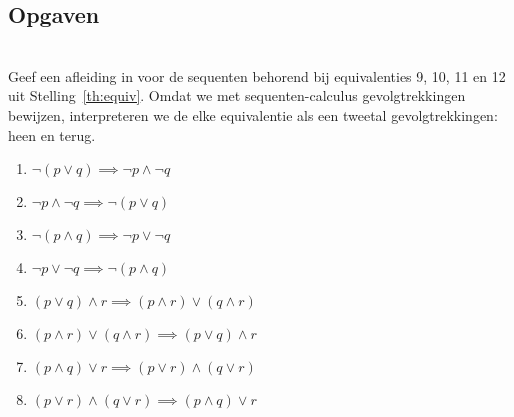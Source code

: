 \subsection{Opgaven}
\begin{exercise}\mbox{}\\
  Geef een afleiding in \lk{} voor de sequenten behorend bij equivalenties 9, 10, 11 en 12 uit Stelling~\ref{th:equiv}. Omdat we met sequenten-calculus gevolgtrekkingen bewijzen, interpreteren we de elke equivalentie als een tweetal gevolgtrekkingen: heen en terug.

\begin{enumerate}[label=\textit{\alph*.}]
\item $\neg(p\lor q) \implies \neg p\land\neg q$ \\
\item $\neg p\land\neg q \implies \neg(p\lor q)$ \\
\item $\neg(p\land q) \implies \neg p \lor\neg q$ \\
\item $\neg p \lor\neg q \implies \neg(p\land q)$ \\
\item $(p\lor q)\land r \implies (p\land r)\lor(q\land r)$ \\
\item $(p\land r)\lor(q\land r) \implies (p\lor q)\land r$  \\
\item $(p\land q)\lor r \implies (p\lor r)\land(q\lor r)$ \\
\item $(p\lor r)\land(q\lor r) \implies (p\land q)\lor r$  \\
\end{enumerate}
\end{exercise}


